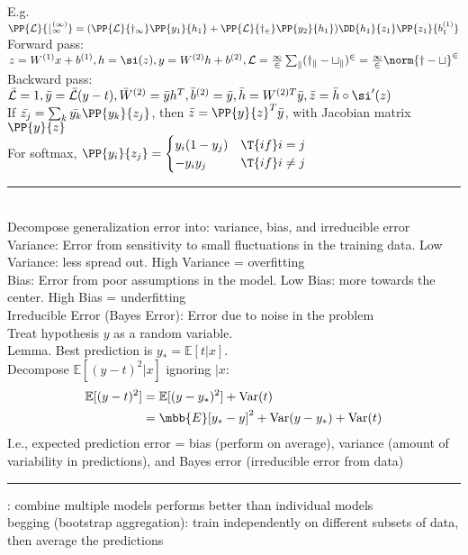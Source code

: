 \documentclass[10pt]{CheatSheet/hw}
\begin{document}
\begin{multicols*}{5}
E.g. $\PP{\cal{L}}{b_1^{(1)}}=(\PP{\cal{L}}{y_1}\PP{y_1}{h_1}+\PP{\cal{L}}{y_2}\PP{y_2}{h_1})\DD{h_1}{z_1}\PP{z_1}{b_1^{(1)}}$\\
Forward pass: $z=W^{(1)}x+b^{(1)}, h=\si(z), y=W^{(2)}h+b^{(2)}, \cal{L}=\frac12\sum_k (y_k-t_k)^2=\frac12\norm{y-t}^2$\\
Backward pass: $\bar{\cal{L}}=1, \bar{y}=\bar{\cal{L}}(y-t), \bar{W}^{(2)}=\bar{y}h^T, \bar{b}^{(2)}=\bar{y}, \bar{h}=W^{(2)T}\bar{y}, \bar{z}=\bar{h}\circ\si'(z)$\\
If $\bar{z_j}=\sum_k \bar{y_k}\PP{y_k}{z_j}$, then $\bar{z}=\PP{y}{z}^T\bar{y}$, with Jacobian matrix $\PP{y}{z}$\\
For softmax, $\PP{y_i}{z_j}=\begin{cases}
    y_i(1-y_j) & \T{if } i=j\\
    -y_i y_j & \T{if } i\ne j
\end{cases}$\\
\rule{\linewidth}{0.4pt}
\\
Decompose generalization error into: variance, bias, and irreducible error\\
Variance: Error from sensitivity to small fluctuations in the training data. Low Variance: less spread out. High Variance = overfitting\\
Bias: Error from poor assumptions in the model. Low Bias: more towards the center. High Bias = underfitting\\
Irreducible Error (Bayes Error): Error due to noise in the problem\\
Treat hypothesis $y$ as a random variable.\\
Lemma. Best prediction is $y_{*}=\mathbb{E}[t|x]$.\\
Decompose $\mathbb{E}[(y-t)^2|x]$ ignoring $|x$:
\begin{align*}
    \mathbb{E}[(y-t)^2]&=\mathbb{E}[(y-y_*)^2]+\operatorname{Var}(t)\\
    &=\mbb{E}[y_*-y]^2 + \operatorname{Var}(y-y_*)+\operatorname{Var}(t)
\end{align*}
I.e., expected prediction error = bias (perform on average), variance (amount of variability in predictions), and Bayes error (irreducible error from data)\\
\rule{\linewidth}{0.4pt}
: combine multiple models performs better than individual models\\
begging (bootstrap aggregation): train independently on different subsets of data, then average the predictions\\

\end{multicols*}
\end{document}

